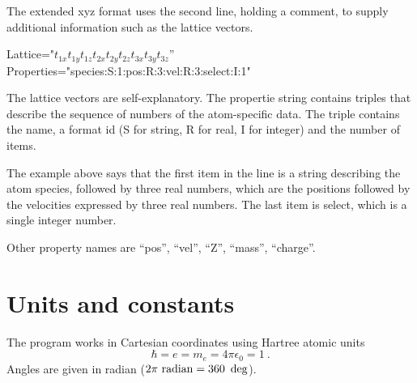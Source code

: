 \documentclass[final,12pt,makeidx,DIV=calc]{article}
\begin{document}
{{{{{{The extended xyz format uses the second line, holding a comment, to
supply additional information such as the lattice vectors.

\begin{centerline}
Lattice="$t_{1x} t_{1y} t_{1z} t_{2x} t_{2y} t_{2z}  t_{3x} t_{3y} t_{3z}$''
Properties="species:S:1:pos:R:3:vel:R:3:select:I:1"
\end{centerline}
The lattice vectors are self-explanatory. The propertie string
contains triples that describe the sequence of numbers of the
atom-specific data. The triple contains the name, a format id (S for
string, R for real, I for integer) and the number of items.

The example above says that the first item in the line is a string
describing the atom species, followed by three real numbers, which are
the positions followed by the velocities expressed by three real
numbers. The last item is select, which is a single integer number.

Other property names are ``pos'', ``vel'', ``Z'', ``mass'', ``charge''.


\newpage
\section{Units and constants}
\label{constants}

The program works in Cartesian coordinates using Hartree atomic units
\begin{equation}
\hbar=e=m_e=4\pi\epsilon_0=1 \ .
\end{equation}
Angles are given in radian ($2\pi~{\rm radian}=360~\deg$).

}}}}}}
\end{document}
